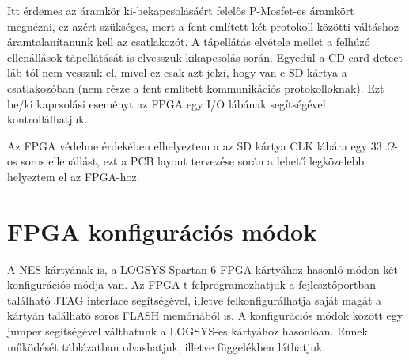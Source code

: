 	Itt érdemes az áramkör ki-bekapcsolásáért felelős P-Mosfet-es áramkört megnézni, ez azért szükséges, mert a fent említett két protokoll közötti váltáshoz áramtalanítanunk kell az csatlakozót. A tápellátás elvétele mellet a felhúzó ellenállások tápellátását is elvesszük kikapcsolás során. Egyedül a CD card detect láb-tól nem vesszük el, mivel ez csak azt jelzi, hogy van-e SD kártya a csatlakozóban (nem része a fent említett kommunikációs protokolloknak). Ezt be/ki kapcsolási eseményt az FPGA egy I/O lábának segítségével kontrollálhatjuk.
	
	Az FPGA védelme érdekében elhelyeztem a az SD kártya CLK lábára egy 33 $\Omega$-os soros ellenállást, ezt a PCB layout tervezése során a lehető legközelebb helyeztem el az FPGA-hoz.  
	
\section{FPGA konfigurációs módok}
	
	A NES kártyának is, a LOGSYS Spartan-6 FPGA kártyához hasonló módon \cite{spatan6} két konfigurációs módja van. Az FPGA-t felprogramozhatjuk a fejlesztőportban található JTAG interface segítségével, illetve felkonfigurálhatja saját magát a kártyán található soros FLASH memóriából is. A konfigurációs módok között egy jumper segítségével válthatunk a LOGSYS-es kártyához hasonlóan. Ennek működését  táblázatban olvashatjuk, illetve  függelékben láthatjuk.       
	
